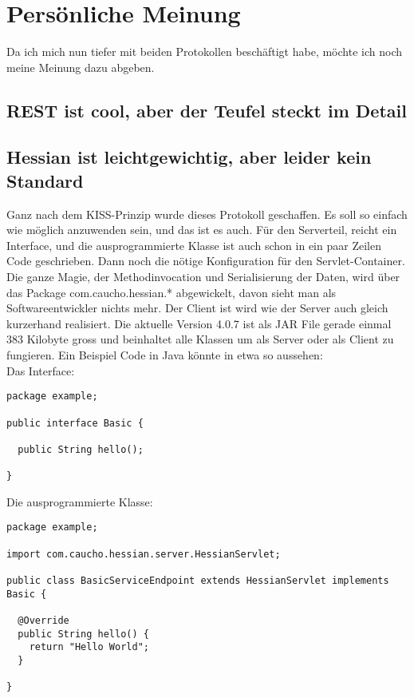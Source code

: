 \documentclass[abstracton, listof=totocnumbered,
bibliography=totocnumbered]{scrreprt}
\begin{document}
  \clearpage
 
  \section{Persönliche Meinung}
  
  Da ich mich nun tiefer mit beiden Protokollen beschäftigt habe, möchte ich
  noch meine Meinung dazu abgeben.
  
  \subsection{REST ist cool, aber der Teufel steckt im Detail}
  
  
  
  
  
  \subsection{Hessian ist leichtgewichtig, aber leider kein Standard}
  
  Ganz nach dem KISS-Prinzip\cite{KISS} wurde dieses Protokoll geschaffen. Es
  soll so einfach wie möglich anzuwenden sein, und das ist es auch. Für den
  Serverteil, reicht ein Interface, und die ausprogrammierte Klasse ist auch
  schon in ein paar Zeilen Code geschrieben. Dann noch die nötige Konfiguration
  für den Servlet-Container. Die ganze Magie, der Methodinvocation und
  Serialisierung der Daten, wird über das Package com.caucho.hessian.*
  abgewickelt, davon sieht man als Softwareentwickler nichts mehr. Der Client
  ist wird wie der Server auch gleich kurzerhand realisiert. Die aktuelle
  Version 4.0.7 ist als JAR File gerade einmal 383 Kilobyte gross und
  beinhaltet alle Klassen um als Server oder als Client zu fungieren. Ein
  Beispiel Code in Java könnte in etwa so aussehen:\\

  Das Interface:
  
\begin{verbatim}
package example;  

public interface Basic {

  public String hello();
  
}
\end{verbatim}

  Die ausprogrammierte Klasse:

\begin{verbatim}
package example;  
  
import com.caucho.hessian.server.HessianServlet;

public class BasicServiceEndpoint extends HessianServlet implements Basic {

  @Override
  public String hello() {
    return "Hello World";
  }
      
}
\end{verbatim}
\end{document}
